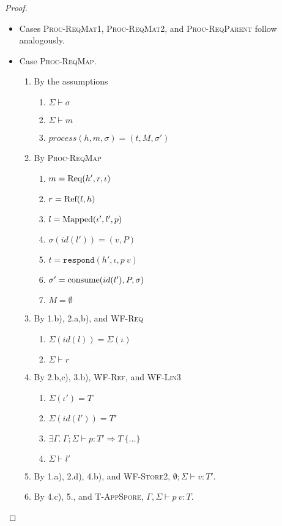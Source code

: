 \begin{proof}
\begin{itemize}
\item Cases \textsc{Proc-ReqMat1}, \textsc{Proc-ReqMat2}, and \textsc{Proc-ReqParent} follow analogously.

\item Case \textsc{Proc-ReqMap}.
\begin{enumerate}
\item By the assumptions
  \begin{enumerate}[label=(\alph*)]
  \item $\Sigma \vdash \sigma$
  \item $\Sigma \vdash m$
  \item $process(h, m, \sigma) = (t, M, \sigma')$
  \end{enumerate}
\item By \textsc{Proc-ReqMap}
  \begin{enumerate}[label=(\alph*)]
  \item $m = {\textrm{Req}(h', r, \iota)}$
  \item $r = {\textrm{Ref}(l, h)}$
  \item $l = {\textrm{Mapped}(\iota', l', p)}$
  \item $\sigma(id(l')) = (v, P)$
  \item $t = \texttt{respond}(h', \iota, p~v)$
  \item $\sigma' = {\textrm{consume}(id(l'), P, \sigma)}$
  \item $M = \emptyset$
  \end{enumerate}
\item By 1.b), 2.a,b), and \textsc{WF-Req}
  \begin{enumerate}[label=(\alph*)]
  \item $\Sigma(id(l)) = \Sigma(\iota)$
  \item $\Sigma \vdash r$
  \end{enumerate}
\item By 2.b,c), 3.b), \textsc{WF-Ref}, and \textsc{WF-Lin3}
  \begin{enumerate}[label=(\alph*)]
  \item $\Sigma(\iota') = T$
  \item $\Sigma(id(l')) = T'$
  \item $\exists \Gamma.~\Gamma ; \Sigma \vdash p : T' \Rightarrow T~\{\ldots\}$
  \item $\Sigma \vdash l'$
  \end{enumerate}
\item By 1.a), 2.d), 4.b), and \textsc{WF-Store2}, $\emptyset ; \Sigma \vdash v : T'$.
\item By 4.c), 5., and \textsc{T-AppSpore}, $\Gamma, \Sigma \vdash p~v : T$.

\end{enumerate}
\end{itemize}
\end{proof}

